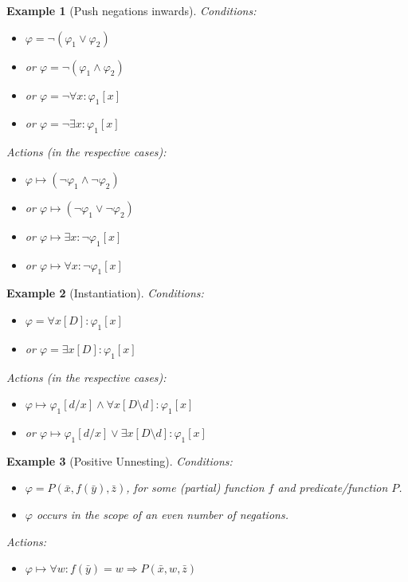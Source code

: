 \documentclass{article}
\newtheorem{example}{Example}
\begin{document}
\begin{example}[Push negations inwards]
Conditions:
\begin{itemize}
	\item $\varphi = \lnot\left( \varphi_1 \lor \varphi_2\right)$
    \item or $\varphi = \lnot\left( \varphi_1 \land \varphi_2\right)$    
    \item or $\varphi = \lnot\forall x: \varphi_1[x]$    
    \item or $\varphi = \lnot\exists x: \varphi_1[x]$
\end{itemize}
Actions (in the respective cases):
\begin{itemize}
	\item $\varphi \mapsto\left(  \lnot \varphi_1 \land  \lnot \varphi_2\right)$
    \item or $\varphi \mapsto \left( \lnot \varphi_1 \lor \lnot \varphi_2\right)$
    \item or $\varphi \mapsto \exists x: \lnot\varphi_1[x]$
    \item or $\varphi \mapsto \forall x: \lnot\varphi_1[x]$ 
\end{itemize}
\end{example}

\begin{example}[Instantiation]
Conditions:
\begin{itemize}
    \item  $\varphi = \forall x[D]: \varphi_1[x]$
    \item or $\varphi = \exists x[D]: \varphi_1[x]$
\end{itemize}
Actions (in the respective cases):
\begin{itemize}
    \item  $\varphi \mapsto \varphi_1[d/x] \land  \forall x[D\setminus d]: \varphi_1[x]$
    \item or $\varphi \mapsto \varphi_1[d/x] \lor  \exists x[D\setminus d]: \varphi_1[x]$
\end{itemize}
\end{example}

\begin{example}[Positive Unnesting]
Conditions:
\begin{itemize}
    \item $\varphi = P(\bar x, f(\bar y),\bar z)$, for some (partial) function $f$ and predicate/function $P$.
    \item $\varphi$ occurs in the scope of an even number of negations.
\end{itemize}
Actions:
\begin{itemize}
    \item $\varphi \mapsto \forall w: f(\bar y) = w \Rightarrow P(\bar x, w, \bar z)$
\end{itemize}
\end{example}
\end{document}
